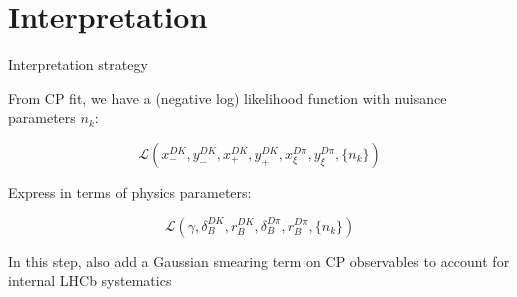 \documentclass{beamer}
\begin{document}
\section{Interpretation}
\begin{frame}{Interpretation strategy}
  \begin{center}
    {\large From CP fit, we have a (negative log) likelihood function with nuisance parameters $n_k$:}
  \end{center}
  \begin{equation*}
    \mathcal{L}(x_-^{DK}, y_-^{DK}, x_+^{DK}, y_+^{DK}, x_\xi^{D\pi}, y_\xi^{D\pi}, \{n_k\})
  \end{equation*}
  \vspace{0.1cm}
  \begin{center}
    {\large Express in terms of physics parameters:}
  \end{center}
  \begin{equation*}
    \mathcal{L}(\gamma, \delta_B^{DK}, r_B^{DK}, \delta_B^{D\pi}, r_B^{D\pi}, \{n_k\})
  \end{equation*}
  \vspace{0.1cm}
  \begin{center}
    {\normalsize In this step, also add a Gaussian smearing term on CP observables to account for internal LHCb systematics}
  \end{center}
\end{frame}
\end{document}
